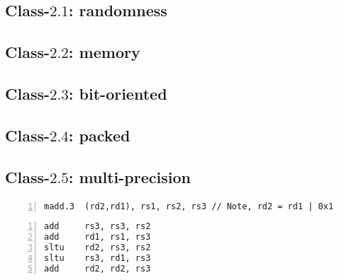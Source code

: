 
\subsection{Class-$2.1$: randomness}
\label{appx:instr_equiv:2:1}


\subsection{Class-$2.2$: memory}
\label{appx:instr_equiv:2:2}


\subsection{Class-$2.3$: bit-oriented}
\label{appx:instr_equiv:2:3}


\subsection{Class-$2.4$: packed}
\label{appx:instr_equiv:2:4}


\subsection{Class-$2.5$: multi-precision}
\label{appx:instr_equiv:2:5}


\paragraph{}

\begin{lstlisting}[frame={single},numbers={left},title={\XCRYPTO}]
madd.3  (rd2,rd1), rs1, rs2, rs3 // Note, rd2 = rd1 | 0x1
\end{lstlisting}

\begin{lstlisting}[frame={single},numbers={left},title={RV32IM/RV64IM}]
add     rs3, rs3, rs2
add     rd1, rs1, rs3
sltu    rd2, rs3, rs2
sltu    rs3, rd1, rs3
add     rd2, rd2, rs3
\end{lstlisting}

